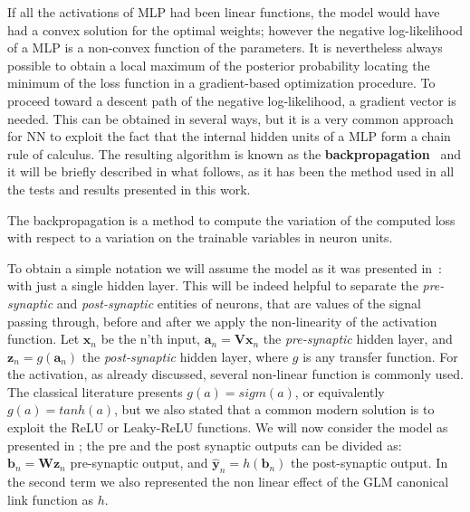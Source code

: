 If all the activations of \acs{MLP} had been linear functions, the model would have had a convex solution for the optimal weights; however the negative log-likelihood of a \acl{MLP} is a non-convex function of the parameters. It is nevertheless always possible to obtain a local maximum of the posterior probability locating the minimum of the loss function in a gradient-based optimization procedure. 
To proceed toward a descent path of the negative log-likelihood, a gradient vector is needed. This can be obtained in several ways, but it is a very common approach for NN to exploit the fact that the internal hidden units of a \acl{MLP} form a chain rule of calculus. The resulting algorithm is known as the \textbf{backpropagation}~\cite{NIPS2012_4824} and it will be briefly described in what follows, as it has been the method used in all the tests and results presented in this work. 

The backpropagation is a method to compute the variation of the computed loss with respect to a variation on the trainable variables in neuron units.

To obtain a simple notation we will assume the model as it was presented in~\Figure{\ref{fig:generic_mlp_a}}: with just a single hidden layer. This will be indeed helpful to separate the \textit{pre-synaptic} and \textit{post-synaptic} entities of neurons, that are values of the signal passing through, before and after we apply the non-linearity of the activation function. Let $\bm{x}_n$ be the n'th input, $\bm{a}_n = \bm{V}\bm{x}_n$ the \textit{pre-synaptic} hidden layer, and $\bm{z}_n = g(\bm{a}_n)$ the \textit{post-synaptic} hidden layer, where $g$ is any transfer function. 
For the activation, as already discussed, several non-linear function is commonly used. The classical literature presents $g(a) = sigm(a)$, or equivalently $g(a) = tanh(a)$, but we also stated that a common modern solution is to exploit the ReLU or Leaky-ReLU functions. 
We will now consider the model as presented in \Equation{\ref{eq:mlp_a}}; the pre and the post synaptic outputs can be divided as: $\bm{b}_n = \bm{W}\bm{z}_n$ pre-synaptic output, and $\hat{\bm{y}}_n = h(\bm{b}_n)$ the post-synaptic output. In the second term we also represented the non linear effect of the \acl{GLM} canonical link function as $h$.

